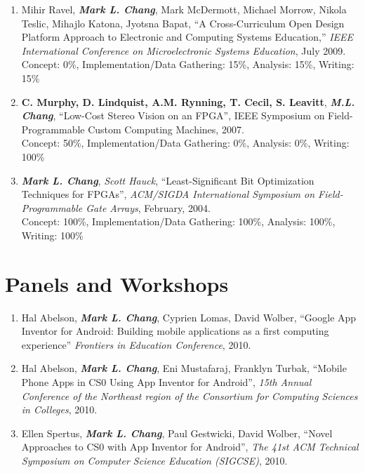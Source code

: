 \documentclass[line]{res}
\begin{document}
\begin{resume}
\begin{enumerate}
		\item Mihir Ravel, \textbf{\textit{Mark L. Chang}}, Mark McDermott, Michael Morrow, Nikola Teslic, Mihajlo Katona, Jyotsna Bapat, ``A Cross-Curriculum Open Design Platform Approach to Electronic and Computing Systems Education,'' \emph{IEEE International Conference on Microelectronic Systems Education}, July 2009.\\
		Concept: 0\%, Implementation/Data Gathering: 15\%, Analysis: 15\%, Writing: 15\%
		
		\item \textbf{C. Murphy, D. Lindquist, A.M. Rynning, T. Cecil, S. Leavitt}, \textbf{\textit{M.L. Chang}}, ``Low-Cost Stereo Vision on an FPGA'', IEEE Symposium on Field-Programmable Custom Computing Machines, 2007.\\
		Concept: 50\%, Implementation/Data Gathering: 0\%, Analysis: 0\%, Writing: 100\%
		
		\item \textbf{\textit{Mark L. Chang}}, \textit{Scott Hauck}, ``Least-Significant Bit Optimization Techniques for FPGAs'', \emph{ACM/SIGDA International Symposium on Field-Programmable Gate Arrays}, February, 2004.\\
		Concept: 100\%, Implementation/Data Gathering: 100\%, Analysis: 100\%, Writing: 100\%
	\end{enumerate}
	
	\section{\sc Panels and Workshops}
	\begin{enumerate}
		
		\item Hal Abelson, \textbf{\textit{Mark L. Chang}}, Cyprien Lomas, David Wolber, ``Google App Inventor for Android: Building mobile applications as a first computing experience'' \textit{Frontiers in Education Conference}, 2010.
		
		\item Hal Abelson, \textbf{\textit{Mark L. Chang}}, Eni Mustafaraj, Franklyn Turbak, ``Mobile Phone Apps in CS0 Using App Inventor for Android'', \textit{15th Annual Conference of the Northeast region of the Consortium for Computing Sciences in Colleges}, 2010.
		
		\item Ellen Spertus, \textbf{\textit{Mark L. Chang}}, Paul Gestwicki, David Wolber, ``Novel Approaches to CS0 with App Inventor for Android'', \textit{The 41st ACM Technical Symposium on Computer Science Education (SIGCSE)}, 2010. 
	\end{enumerate}
	

\end{resume}
\end{document}
